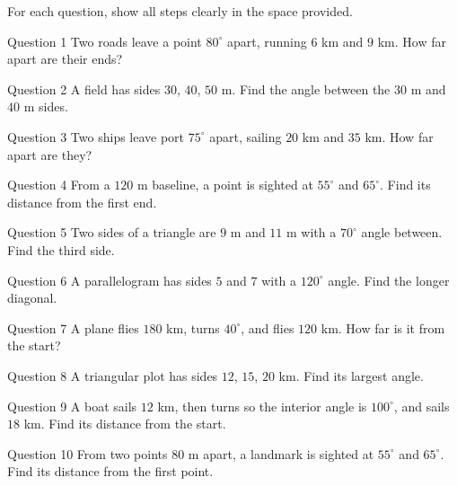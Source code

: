\documentclass[11pt]{article}
\begin{document}
\clearpage
{}
For each question, show all steps clearly in the space provided.

\begin{qbox}{Question 1}
Two roads leave a point $80^\circ$ apart, running $6$ km and $9$ km. How far apart are their ends?\workspace{2.6cm}
\end{qbox}

\begin{qbox}{Question 2}
A field has sides $30$, $40$, $50$ m. Find the angle between the $30$ m and $40$ m sides.\workspace{2.6cm}
\end{qbox}

\begin{qbox}{Question 3}
Two ships leave port $75^\circ$ apart, sailing $20$ km and $35$ km. How far apart are they?\workspace{2.6cm}
\end{qbox}

\begin{qbox}{Question 4}
From a $120$ m baseline, a point is sighted at $55^\circ$ and $65^\circ$. Find its distance from the first end.\workspace{2.8cm}
\end{qbox}

\begin{qbox}{Question 5}
Two sides of a triangle are $9$ m and $11$ m with a $70^\circ$ angle between. Find the third side.\workspace{2.4cm}
\end{qbox}

\begin{qbox}{Question 6}
A parallelogram has sides $5$ and $7$ with a $120^\circ$ angle. Find the longer diagonal.\workspace{2.4cm}
\end{qbox}

\begin{qbox}{Question 7}
A plane flies $180$ km, turns $40^\circ$, and flies $120$ km. How far is it from the start?\workspace{2.8cm}
\end{qbox}

\begin{qbox}{Question 8}
A triangular plot has sides $12$, $15$, $20$ km. Find its largest angle.\workspace{2.6cm}
\end{qbox}

\begin{qbox}{Question 9}
A boat sails $12$ km, then turns so the interior angle is $100^\circ$, and sails $18$ km. Find its distance from the start.\workspace{2.8cm}
\end{qbox}

\begin{qbox}{Question 10}
From two points $80$ m apart, a landmark is sighted at $55^\circ$ and $65^\circ$. Find its distance from the first point.\workspace{2.8cm}
\end{qbox}
\end{document}
